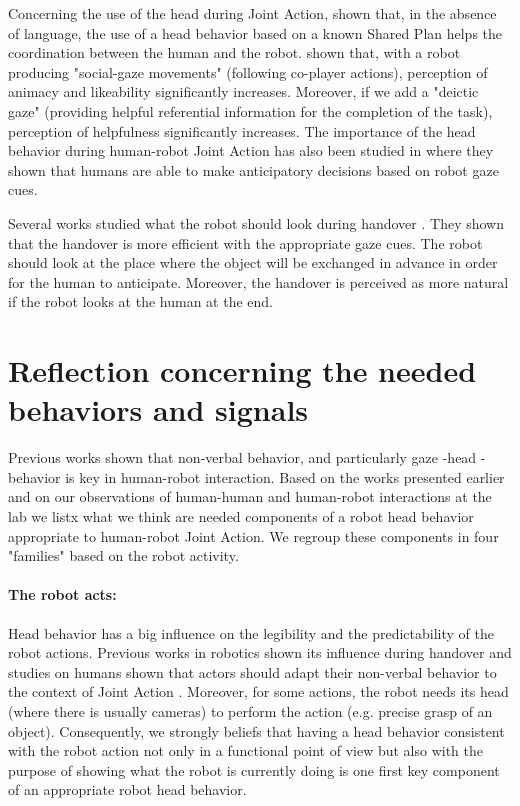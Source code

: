 \documentclass[english,a4paper,11pt,twoside]{StyleThese}
\begin{document}
Concerning the use of the head during Joint Action, \cite{lallee2013cooperative} shown that, in the absence of language, the use of a head behavior based on a known Shared Plan helps the coordination between the human and the robot. \cite{zaga2017simple} shown that, with a robot producing "social-gaze movements" (following co-player actions), perception of animacy and likeability significantly increases. Moreover, if we add a "deictic gaze" (providing helpful referential information for the completion of the task), perception of helpfulness significantly increases. The importance of the head behavior during human-robot Joint Action has also been studied in \cite{boucher2012reach} where they shown that humans are able to make anticipatory decisions based on robot gaze cues. 

Several works studied what the robot should look during handover \cite{moon2014meet, gharbi2015toward}. They shown that the handover is more efficient with the appropriate gaze cues. The robot should look at the place where the object will be exchanged in advance in order for the human to anticipate. Moreover, the handover is perceived as more natural if the robot looks at the human at the end.


\section{Reflection concerning the needed behaviors and signals}

\label{sec:reflection}

Previous works shown that non-verbal behavior, and particularly gaze -head - behavior is key in human-robot interaction. Based on the works presented earlier and on our observations of human-human and human-robot interactions at the lab we listx what we think are needed components of a robot head behavior appropriate to human-robot Joint Action. We regroup these components in four "families" based on the robot activity.

\paragraph{The robot acts:}
Head behavior has a big influence on the legibility and the predictability of the robot actions. Previous works in robotics shown its influence during handover \cite{moon2014meet, gharbi2015toward} and studies on humans shown that actors should adapt their non-verbal behavior to the context of Joint Action \cite{becchio2010toward, vesper2010minimal}. Moreover, for some actions, the robot needs its head (where there is usually cameras) to perform the action (e.g. precise grasp of an object). Consequently, we strongly beliefs that having a head behavior consistent with the robot action not only in a functional point of view but also with the purpose of showing what the robot is currently doing is one first key component of an appropriate robot head behavior.
\end{document}
